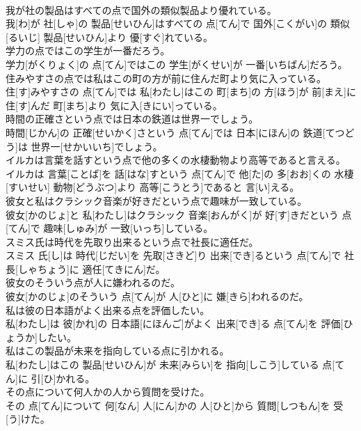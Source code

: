 \documentclass[8pt]{extreport}
\begin{document}
\begin{CJK}{UTF8}{min}
\\	我が社の製品はすべての点で国外の類似製品より優れている。	
\\	我[わ]が 社[しゃ]の 製品[せいひん]はすべての 点[てん]で 国外[こくがい]の 類似[るいじ] 製品[せいひん]より 優[すぐ]れている。
\\	学力の点ではこの学生が一番だろう。	
\\	学力[がくりょく]の 点[てん]ではこの 学生[がくせい]が 一番[いちばん]だろう。
\\	住みやすさの点では私はこの町の方が前に住んだ町より気に入っている。	
\\	住[す]みやすさの 点[てん]では 私[わたし]はこの 町[まち]の 方[ほう]が 前[まえ]に 住[す]んだ 町[まち]より 気に入[きにい]っている。
\\	時間の正確さという点では日本の鉄道は世界一でしょう。	
\\	時間[じかん]の 正確[せいかく]さという 点[てん]では 日本[にほん]の 鉄道[てつどう]は 世界一[せかいいち]でしょう。
\\	イルカは言葉を話すという点で他の多くの水棲動物より高等であると言える。	
\\	イルカは 言葉[ことば]を 話[はな]すという 点[てん]で 他[た]の 多[おお]くの 水棲[すいせい] 動物[どうぶつ]より 高等[こうとう]であると 言[い]える。
\\	彼女と私はクラシック音楽が好きだという点で趣味が一致している。	
\\	彼女[かのじょ]と 私[わたし]はクラシック 音楽[おんがく]が 好[す]きだという 点[てん]で 趣味[しゅみ]が 一致[いっち]している。
\\	スミス氏は時代を先取り出来るという点で社長に適任だ。	
\\	スミス 氏[し]は 時代[じだい]を 先取[さきど]り 出来[でき]るという 点[てん]で 社長[しゃちょう]に 適任[てきにん]だ。
\\	彼女のそういう点が人に嫌われるのだ。	
\\	彼女[かのじょ]のそういう 点[てん]が 人[ひと]に 嫌[きら]われるのだ。
\\	私は彼の日本語がよく出来る点を評価したい。	
\\	私[わたし]は 彼[かれ]の 日本語[にほんご]がよく 出来[でき]る 点[てん]を 評価[ひょうか]したい。
\\	私はこの製品が未来を指向している点に引かれる。	
\\	私[わたし]はこの 製品[せいひん]が 未来[みらい]を 指向[しこう]している 点[てん]に 引[ひ]かれる。
\\	その点について何人かの人から質問を受けた。	
\\	その 点[てん]について 何[なん] 人[にん]かの 人[ひと]から 質問[しつもん]を 受[う]けた。

\end{CJK}
\end{document}
